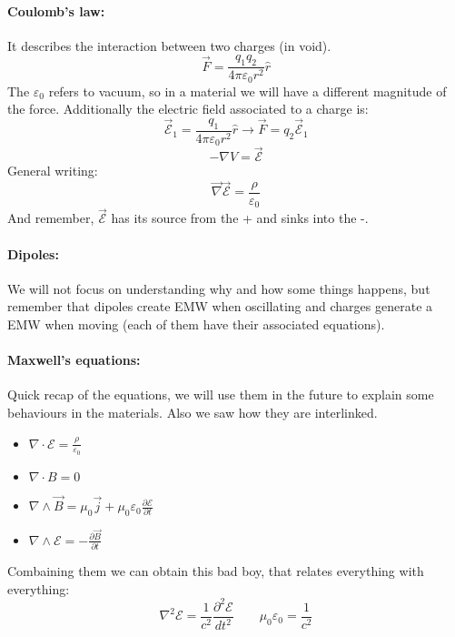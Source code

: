 \paragraph{Coulomb's law:} It describes the interaction between two charges (in void).
\begin{equation}       
    \vec{F} = \frac{q_1q_2}{4\pi\varepsilon_0 r^2}\hat{r}
\end{equation}
The $\varepsilon_0$ refers to vacuum, so in a material we will have a different magnitude of the force. Additionally the electric field associated to a charge is:
\begin{equation}
    \vec{\mathcal{E}}_1 = \frac{q_1}{4\pi\varepsilon_0 r^2}\hat{r} \rightarrow \vec{F} = q_2 \vec{\mathcal{E}}_1
\end{equation}
\begin{equation}
-\nabla V = \vec{\mathcal{E}}
\end{equation}
General writing:
\begin{equation}
    \vec{\nabla} \vec{\mathcal{E}} = \frac{\rho}{\varepsilon_0}
\end{equation}
And remember, $\vec{\mathcal{E}}$ has its source from the + and sinks into the -.

\paragraph{Dipoles:} We will not focus on understanding why and how some things happens, but remember that dipoles create EMW when oscillating and charges generate a EMW when moving (each of them have their associated equations).

\paragraph{Maxwell's equations:} Quick recap of the equations, we will use them in the future to explain some behaviours in the materials. Also we saw how they are interlinked.
\begin{itemize}
    \item $\nabla \cdot \mathcal{E} = \frac{\rho}{\varepsilon_0}$
    \item $\nabla \cdot B = 0$
    \item $\nabla \wedge \vec{B} = \mu_0 \vec{j} + \mu_0 \varepsilon_0 \frac{\partial \mathcal{E}}{\partial t}$
    \item $\nabla \wedge \mathcal{E} = -\frac{\partial \vec{B}}{\partial t}$
\end{itemize}
Combaining them we can obtain this bad boy, that relates everything with everything:
\begin{equation}
    \nabla^2 \mathcal{E} = \frac{1}{c^2} \frac{\partial^2\mathcal{E}}{dt^2} \qquad \mu_0\varepsilon_0 = \frac{1}{c^2}
\end{equation}

